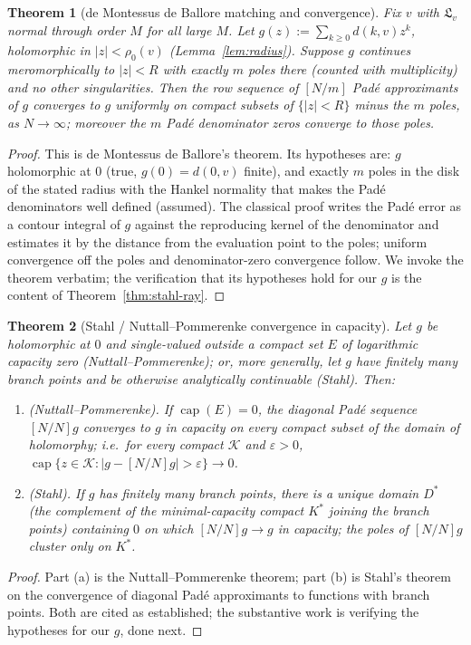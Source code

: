 \documentclass[11pt]{article}
\DeclareMathOperator{\cpn}{cap}
\newcommand{\eps}{\varepsilon}
\theoremstyle{plain}
\newtheorem{theorem}{Theorem}[section]
\theoremstyle{definition}
\theoremstyle{remark}
\begin{document}
\begin{theorem}[de Montessus de Ballore matching and convergence]
\label{thm:demont-match}
Fix $v$ with $\mathfrak L_v$ normal through order $M$ for all large $M$. Let
$g(z):=\sum_{k\ge0}d(k,v)z^k$, holomorphic in $|z|<\rho_0(v)$
(Lemma~\ref{lem:radius}). Suppose $g$ continues meromorphically to $|z|<\!R$ with
exactly $m$ poles there (counted with multiplicity) and no other singularities.
Then the row sequence of $[N/m]$ Padé approximants of $g$ converges to $g$
uniformly on compact subsets of $\{|z|<R\}$ minus the $m$ poles, as $N\to\infty$;
moreover the $m$ Padé denominator zeros converge to those poles.
\end{theorem}
\begin{proof}
This is de Montessus de Ballore's theorem. Its hypotheses are: $g$ holomorphic at
$0$ (true, $g(0)=d(0,v)$ finite), and exactly $m$ poles in the disk of the stated
radius with the Hankel normality that makes the Padé denominators well defined
(assumed). The classical proof writes the Padé error as a contour integral of
$g$ against the reproducing kernel of the denominator and estimates it by the
distance from the evaluation point to the poles; uniform convergence off the
poles and denominator-zero convergence follow. We invoke the theorem verbatim; the
verification that its hypotheses hold for our $g$ is the content of
Theorem~\ref{thm:stahl-ray}.
\end{proof}

\begin{theorem}[Stahl / Nuttall--Pommerenke convergence in capacity]
\label{thm:stahl}
Let $g$ be holomorphic at $0$ and single-valued outside a compact set $E$ of
logarithmic capacity zero (Nuttall--Pommerenke); or, more generally, let $g$ have
finitely many branch points and be otherwise analytically continuable (Stahl).
Then:
\begin{enumerate}[label=(\alph*),leftmargin=2em]
\item \emph{(Nuttall--Pommerenke).} If $\cpn(E)=0$, the diagonal Padé sequence
$[N/N]g$ converges to $g$ in capacity on every compact subset of the domain of
holomorphy; i.e.\ for every compact $\mathcal K$ and $\eps>0$,
$\cpn\{z\in\mathcal K:|g-[N/N]g|>\eps\}\to0$.
\item \emph{(Stahl).} If $g$ has finitely many branch points, there is a unique
domain $D^\ast$ (the complement of the minimal-capacity compact $K^\ast$ joining
the branch points) containing $0$ on which $[N/N]g\to g$ in capacity; the poles of
$[N/N]g$ cluster only on $K^\ast$.
\end{enumerate}
\end{theorem}
\begin{proof}
Part (a) is the Nuttall--Pommerenke theorem; part (b) is Stahl's theorem on the
convergence of diagonal Padé approximants to functions with branch points. Both
are cited as established; the substantive work is verifying the hypotheses for our
$g$, done next.
\end{proof}
\end{document}
